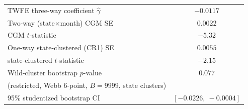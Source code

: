 \begin{tabular}{lc}
\hline\hline
TWFE three-way coefficient $\hat\gamma$ & $-0.0117$ \\
Two-way (state$\times$month) CGM SE & $0.0022$ \\
\quad CGM $t$-statistic & $-5.32$ \\
One-way state-clustered (CR1) SE & $0.0055$ \\
\quad state-clustered $t$-statistic & $-2.15$ \\
\hline
Wild-cluster bootstrap $p$-value & $0.077$ \\
\quad (restricted, Webb 6-point, $B=9999$, state clusters) & \\
95\% studentized bootstrap CI & $[-0.0226,\ -0.0004]$ \\
\hline\hline
\end{tabular}
